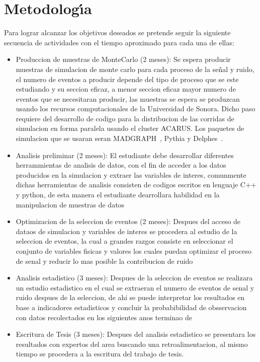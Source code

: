 \chapter{Metodolog\'{\i}a}

Para lograr alcanzar los objetivos deseados se pretende seguir la siguiente secuencia de actividades con el tiempo aproximado para cada una de ellas:

\begin{itemize}
  
\item Produccion de muestras de MonteCarlo (2 meses): Se espera producir muestras de simulacion de monte carlo para cada proceso de la se\~nal y ruido, el numero de eventos a producir depende del tipo de proceso que se este estudiando y su seccion eficaz, a menor seccion eficaz mayor numero de eventos que se necesitaran producir, las muestras se espera se produzcan usando los recursos computacionales de la Universidad de Sonora. Dicho paso requiere del desarrollo de codigo para la distribucion de las corridas de simulacion en forma paralela usando el cluster ACARUS. Los paquetes de simulacion que se usaran seran MADGRAPH~\cite{Alwall:2007st}, Pythia y Delphes~\cite{deFavereau2014}.

\item Analisis preliminar (2 meses): El estudiante debe desarrollar diferentes herrammientas de analisis de datos, con el fin de acceder a los datos producidos en la simulacion y extraer las variables de interes, comunmente dichas herramientas de analisis consisten de codigos escritos en lenguaje C++ y python, de esta manera el estudiante dearrollara habilidad en la manipulacion de muestras de datos 

\item Optimizacion de la seleccion de eventos (2 meses): Despues del acceso de dataos de simulacion y variables de interes se procedera al estudio de la seleccion de eventos, la cual a grandes razgos consiste en seleccionar el conjunto de variables fisicas y valores los cuales puedan optimizar el proceso de senal y reducir lo mas posible la contribucion de ruido 

\item Analisis estadistico (3 meses): Despues de la seleccion de eventos se realizara un estudio estadistico en el cual se extraeran el numero de eventos de senal y ruido despues de la seleccion, de ahi se puede interpretar los resultados en base a indicadores estadisticos y concluir la probabibilidad de obsservacion con datos recolectados en los siguientes anos terminao de

\item Escritura de Tesis (3 meses): Despues del analisis estadistico se presentara los resultados con expertos del area buscando una retroalimentacion, al mismo tiempo se procedera a la escritura del trabajo de tesis. 

\end{itemize}
  
